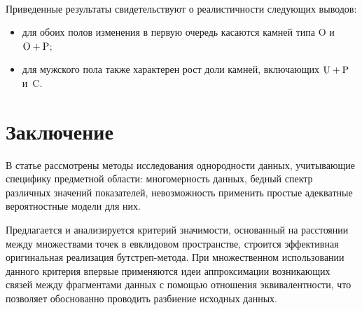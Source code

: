 \begin{figure} %
   \vspace*{1pt}
 \begin{center}
 \mbox{%
 \epsfxsize=141.696mm
 }
 \end{center}
 \vspace*{-9pt}
\end{figure}

\begin{multicols}{2}

      Приведенные результаты свидетельствуют о реалистичности следующих выводов:
      \begin{itemize}
\item для обоих полов изменения в первую очередь касаются камней типа O и 
$\mathrm{O}\hm+\mathrm{P}$;
\item для мужского пола также характерен рост доли камней, включающих 
$\mathrm{U\hm+P}$ и~C.
\end{itemize}
 
\vspace*{-6pt}

\section{Заключение}

\vspace*{-2pt}

      В статье рассмотрены методы исследования однородности данных, учитывающие 
специфику предметной области: многомерность данных, бедный спектр различных значений 
показателей, невозмож\-ность применить простые адекватные вероятностные модели для них. 

Предлагается и анализируется критерий значимости, основанный на расстоянии между 
множествами точек в евклидовом пространстве, строится эффективная оригинальная 
реализация бут\-стреп-ме\-то\-да. При множественном использовании данного критерия 
впервые применяются идеи аппроксимации возникающих связей между фрагментами 
данных с по\-мощью отношения эквивалентности, что позволяет обоснованно проводить 
разбиение исходных данных. 


\end{multicols}

